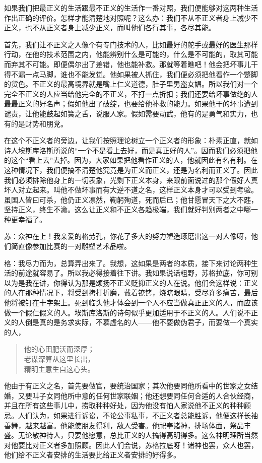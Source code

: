 \documentclass[11pt,oneside]{book}
\begin{document}
\begin{common-format}
如果我们把最正义的生活跟最不正义的生活作一番对照，我们便能够对这两种生活作出正确的评价。怎样才能清楚地对照呢？这么办：我们不从不正义者身上减少不正义，也不从正义者身上减少正义，而叫他们各行其事，各尽其能。

首先，我们让不正义之人像个有专门技术的人，比如最好的舵手或最好的医生那样行动，在他的技术范围之内，他能辨别什么是可能的，什么是不可能的，取其可能而弃其不可能。即便偶尔出了差错，他也能补救。那就等着瞧吧！他会把坏事儿干得不漏一点马脚，谁也不能发觉。他如果被人抓住，我们便必须把他看作一个蹩脚的货色。不正义的最高境界就是嘴上仁义道德，肚子里男盗女娼。所以我们对一个完全不正义的人应当给他完全的不正义，不打一点折扣；我们还要给坏事做绝的人最最正义的好名声；假如他出了破绽，也要给他补救的能力。如果他干的坏事遭到谴责，让他能鼓起如簧之舌，说服人家。假如需要动武，他有的是勇气和实力，也有的是财势和朋党。

在这个不正义者的旁边，让我们按照理论树立一个正义者的形象：朴素正直，就如诗人埃斯库洛斯所说的“一个不是看上去好，而是真正好的人”。因而我们必须把他的这个“看上去”去掉。因为，大家如果把他看作正义的人，他就因此有名有利。在这种情况下，我们便搞不清楚他究竟是为正义而正义，还是为名利而正义了。因此我们必须排除他身上的一切表象，光剩下正义本身，来跟前面说过的那个假好人真坏人对立起来。叫他不做坏事而有大逆不道之名，这样正义本身才可以受到考验。虽国人皆曰可杀，他仍正义凛然，鞠躬殉道，死而后已；他甘愿冒天下之大不韪，坚持正义，终生不渝。这么让正义和不正义各趋极端，我们就好判别两者之中哪一种更幸福了。

苏：众神在上！我亲爱的格劳孔，你花了多大的努力塑造琢磨出这一对人像呀，他们简直像参加比赛的一对雕塑艺术品啦。

格：我尽力而为，总算弄出来了。我想，这如果是两者的本质，接下来讨论两种生活的前途就容易了。所以我必得接着往下讲。我如果说话粗野，苏格拉底，你可别以为是我在讲，你得认为那是颂扬不正义贬抑正义的人在说。他们会这样说：正义的人在那种情况下，将受到拷打折磨，戴着镣铐，烧瞎眼睛，受尽许多痛苦，最后他将被钉在十字架上。死到临头他才体会到一个人不应当做真正正义的人，而应该做一个假仁假义的人。埃斯库洛斯的诗句似乎更加适用于不正义的人。人们说不正义的人倒是真的是务求实际，不慕虚名的人——他不要做伪君子，而要做一个真实的人，
\begin{verse}
他的心田肥沃而深厚；\\
老谋深算从这里长出，\\
精明主意生自这心头。
\end{verse}
他由于有正义之名，首先要做官，要统治国家；其次他要同他所看中的世家之女结婚，又要叫子女同他所中意的任何世家联姻；他还想要同任何合适的人合伙经商，并且在所有这些事儿中，捞取种种好处，因为他没有怕人家说他不正义的种种顾忌。人们认为，如果进行诉讼，不论公事私事，不正义者总能胜诉，他便这样长袖善舞，越来越富。他能使朋友得利，敌人受害。他祀奉诸神，排场体面，祭品丰盛。无论敬神待人，只要他愿意，总比正义的人搞得高明得多。这么神明理所当然对他要比对正义者多加照顾。因此人们会说，苏格拉底呀！诸神也罢，众人也罢，他们给不正义者安排的生活要比给正义者安排的好得多。


\end{common-format}
\end{document}
